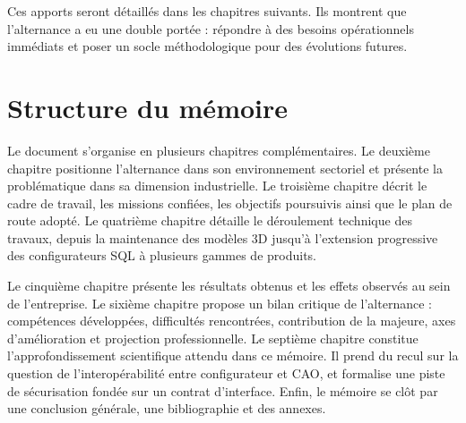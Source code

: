 Ces apports seront détaillés dans les chapitres suivants. Ils montrent que l'alternance a eu une double portée : répondre à des besoins opérationnels immédiats et poser un socle méthodologique pour des évolutions futures.

\section{Structure du mémoire}

Le document s'organise en plusieurs chapitres complémentaires. Le deuxième chapitre positionne l'alternance dans son environnement sectoriel et présente la problématique dans sa dimension industrielle. Le troisième chapitre décrit le cadre de travail, les missions confiées, les objectifs poursuivis ainsi que le plan de route adopté. Le quatrième chapitre détaille le déroulement technique des travaux, depuis la maintenance des modèles 3D jusqu'à l'extension progressive des configurateurs SQL à plusieurs gammes de produits.

Le cinquième chapitre présente les résultats obtenus et les effets observés au sein de l'entreprise. Le sixième chapitre propose un bilan critique de l'alternance : compétences développées, difficultés rencontrées, contribution de la majeure, axes d'amélioration et projection professionnelle. Le septième chapitre constitue l'approfondissement scientifique attendu dans ce mémoire. Il prend du recul sur la question de l'interopérabilité entre configurateur et CAO, et formalise une piste de sécurisation fondée sur un contrat d'interface. Enfin, le mémoire se clôt par une conclusion générale, une bibliographie et des annexes.
